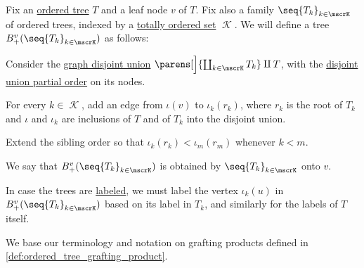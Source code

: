 \begin{definition}\label{def:ordered_tree_grafting}\mimprovised
  Fix an \hyperref[def:ordered_tree]{ordered tree} \( T \) and a leaf node \( v \) of \( T \). Fix also a family \( \seq{ T_k }_{k \in \mscrK} \) of ordered trees, indexed by a \hyperref[def:totally_ordered_set]{totally ordered set} \( \mscrK \). We will define a tree \( B_+^v(\seq{ T_k }_{k \in \mscrK}) \) as follows:
  \begin{thmenum}
     Consider the \hyperref[def:graph_disjoint_union]{graph disjoint union} \( \parens[\Big]{ \coprod_{k \in \mscrK} T_k } \amalg T \), with the \hyperref[thm:order_category_isomorphism_properties/coproduct]{disjoint union partial order} on its nodes.

     For every \( k \in \mscrK \), add an edge from \( \iota(v) \) to \( \iota_k(r_k) \), where \( r_k \) is the root of \( T_k \) and \( \iota \) and \( \iota_k \) are inclusions of \( T \) and of \( T_k \) into the disjoint union.

     Extend the sibling order so that \( \iota_k(r_k) < \iota_m(r_m) \) whenever \( k < m \).
  \end{thmenum}

  We say that \( B_+^v(\seq{ T_k }_{k \in \mscrK}) \) is obtained by  \( \seq{ T_k }_{k \in \mscrK} \) onto \( v \).
\end{definition}
\begin{comments}
  \item In case the trees are \hyperref[def:labeled_tree]{labeled}, we must label the vertex \( \iota_k(u) \) in \( B_+^v(\seq{ T_k }_{k \in \mscrK}) \) based on its label in \( T_k \), and similarly for the labels of \( T \) itself.

  \item We base our terminology and notation on grafting products defined in \cref{def:ordered_tree_grafting_product}.
\end{comments}

